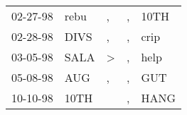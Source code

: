 \begin{supertabular}{p{0.07\textwidth}p{0.06\textwidth}p{0.02\textwidth}p{0.02\textwidth}p{0.06\textwidth}}
 02-27-98\textsuperscript{} &  rebu\textsuperscript{} &             , &  , &  10TH\textsuperscript{} \\
 02-28-98\textsuperscript{} &  DIVS\textsuperscript{} &             , &  , &  crip\textsuperscript{} \\
 03-05-98\textsuperscript{} &  SALA\textsuperscript{} &  \textgreater &  , &  help\textsuperscript{} \\
 05-08-98\textsuperscript{} &   AUG\textsuperscript{} &             , &  , &   GUT\textsuperscript{} \\
 10-10-98\textsuperscript{} &  10TH\textsuperscript{} &               &  , &  HANG\textsuperscript{} \\
\end{supertabular}
